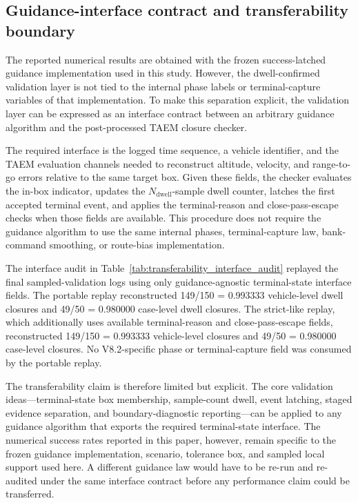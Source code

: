 \subsection{Guidance-interface contract and transferability boundary}
\label{subsec:guidance_interface_transferability}

The reported numerical results are obtained with the frozen success-latched guidance implementation used in this study. However, the dwell-confirmed validation layer is not tied to the internal phase labels or terminal-capture variables of that implementation. To make this separation explicit, the validation layer can be expressed as an interface contract between an arbitrary guidance algorithm and the post-processed TAEM closure checker.

The required interface is the logged time sequence, a vehicle identifier, and the TAEM evaluation channels needed to reconstruct altitude, velocity, and range-to-go errors relative to the same target box. Given these fields, the checker evaluates the in-box indicator, updates the \(N_{\mathrm{dwell}}\)-sample dwell counter, latches the first accepted terminal event, and applies the terminal-reason and close-pass-escape checks when those fields are available. This procedure does not require the guidance algorithm to use the same internal phases, terminal-capture law, bank-command smoothing, or route-bias implementation.

The interface audit in Table~\ref{tab:transferability_interface_audit} replayed the final sampled-validation logs using only guidance-agnostic terminal-state interface fields. The portable replay reconstructed 149/150 = 0.993333 vehicle-level dwell closures and 49/50 = 0.980000 case-level dwell closures. The strict-like replay, which additionally uses available terminal-reason and close-pass-escape fields, reconstructed 149/150 = 0.993333 vehicle-level closures and 49/50 = 0.980000 case-level closures. No V8.2-specific phase or terminal-capture field was consumed by the portable replay.

The transferability claim is therefore limited but explicit. The core validation ideas---terminal-state box membership, sample-count dwell, event latching, staged evidence separation, and boundary-diagnostic reporting---can be applied to any guidance algorithm that exports the required terminal-state interface. The numerical success rates reported in this paper, however, remain specific to the frozen guidance implementation, scenario, tolerance box, and sampled local support used here. A different guidance law would have to be re-run and re-audited under the same interface contract before any performance claim could be transferred.
